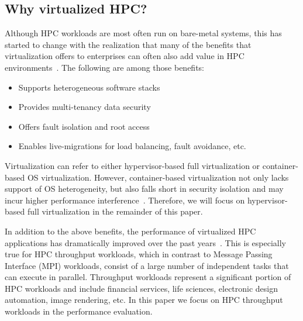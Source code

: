 \subsection{Why virtualized HPC?}
Although HPC workloads are most often run on bare-metal systems, this has started to change 
with the realization that many of the benefits that virtualization offers to enterprises 
can often also add value in HPC environments~\cite{mergen2006virtualization,simons2010virtualizing}. The following are among those benefits:
\begin{itemize}
	\item Supports heterogeneous software stacks
	\item Provides multi-tenancy data security %
	\item Offers fault isolation and root access%
    \item Enables live-migrations for load balancing, fault avoidance, etc.
\end{itemize}

Virtualization can refer to either hypervisor-based full virtualization or container-based OS virtualization. However, container-based virtualization not only lacks support of OS 
heterogeneity, but also falls short in security isolation 
and may incur higher performance interference~\cite{reshetova2014security,sharma2016containers}. Therefore, we will focus on hypervisor-based full virtualization in the remainder of this paper. 

In addition to the above benefits, the performance of virtualized HPC applications has dramatically 
improved over the past years~\cite{luszczek2011evaluation}. This is especially true for HPC throughput workloads, which in contrast to Message Passing Interface (MPI) workloads, 
consist of a large number of independent tasks that can execute in parallel. Throughput workloads represent a 
significant portion of HPC workloads and include financial services, life sciences, electronic design automation, image rendering, etc. In this paper we focus on HPC throughput workloads in the performance evaluation. 


